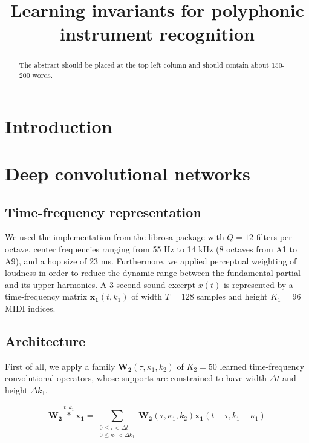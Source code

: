 \documentclass{article}
\title{Learning invariants for polyphonic instrument recognition}
\begin{document}
%
\maketitle
%
\begin{abstract}
The abstract should be placed at the top left column and should contain about 150-200 words.
\end{abstract}
%

\section{Introduction}\label{sec:introduction}


\section{Deep convolutional networks}
\subsection{Time-frequency representation}
We used the implementation from the librosa package \cite{McFee2015} with $Q=12$ filters per octave, center frequencies ranging from 55 Hz to 14 kHz (8 octaves from A1 to A9), and a hop size of 23 ms. Furthermore, we applied perceptual weighting of loudness in order to reduce the dynamic range between the fundamental partial and its upper harmonics. A 3-second sound excerpt $x(t)$ is represented by a time-frequency matrix $\boldsymbol{x_1}(t,k_1)$ of width $T=128$ samples and height $K_1=96$ MIDI indices.

\subsection{Architecture}
First of all, we apply a family $\boldsymbol{W_2}(\tau,\kappa_1,k_2)$ of $K_2=50$ learned time-frequency convolutional operators, whose supports are constrained to have width $\Delta t$ and height $\Delta k_1$. 



\begin{equation}
\boldsymbol{W_2}
\overset{t,k_1}{\ast}
\boldsymbol{x_1}
=
\! \!
\sum_{\substack{
0 \leq \tau < \Delta t \\
0 \leq \kappa_1 < \Delta k_1}} 
\! \! \! \! \!
\boldsymbol{W_2}(\tau,\kappa_1,k_2)
\boldsymbol{x_1}(t-\tau,k_1-\kappa_1)
\end{equation}
\end{document}
